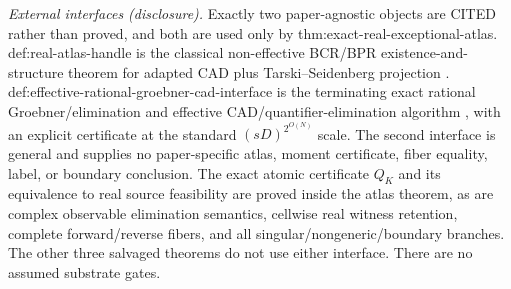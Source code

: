 \documentclass{article}
\begin{document}
\par\smallskip\noindent \textit{External interfaces (disclosure).} Exactly two paper-agnostic objects are CITED rather than proved, and both are used only by thm:exact-real-exceptional-atlas. def:real-atlas-handle is the classical non-effective BCR/BPR existence-and-structure theorem for adapted CAD plus Tarski--Seidenberg projection \cite{BochnakCosteRoy1998,BasuPollackRoy2006}. def:effective-rational-groebner-cad-interface is the terminating exact rational Groebner/elimination and effective CAD/quantifier-elimination algorithm \cite{CoxLittleOShea2015,Collins1975,BasuPollackRoy2006}, with an explicit certificate at the standard $(sD)^{2^{O(N)}}$ scale. The second interface is general and supplies no paper-specific atlas, moment certificate, fiber equality, label, or boundary conclusion. The exact atomic certificate $Q_K$ and its equivalence to real source feasibility are proved inside the atlas theorem, as are complex observable elimination semantics, cellwise real witness retention, complete forward/reverse fibers, and all singular/nongeneric/boundary branches. The other three salvaged theorems do not use either interface. There are no assumed substrate gates.
\end{document}
